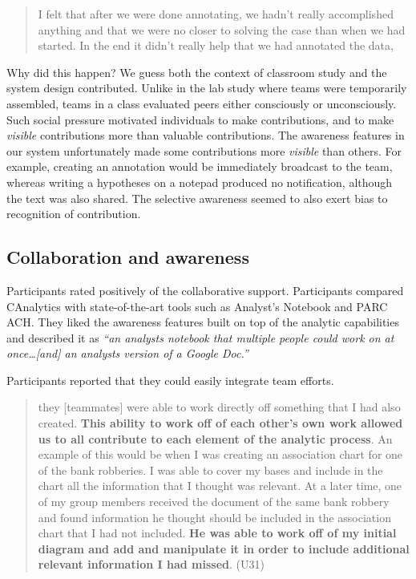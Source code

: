 \begin{quote}
I felt that after we were done annotating, we hadn't really accomplished
anything and that we were no closer to solving the case than when we had
started. In the end it didn't really help that we had annotated the
data,
\end{quote}

Why did this happen? We guess both the context of classroom study and
the system design contributed. Unlike in the lab study where teams were
temporarily assembled, teams in a class evaluated peers either
consciously or unconsciously. Such social pressure motivated individuals
to make contributions, and to make \emph{visible} contributions more
than valuable contributions. The awareness features in our system
unfortunately made some contributions more \emph{visible} than others.
For example, creating an annotation would be immediately broadcast to
the team, whereas writing a hypotheses on a notepad produced no
notification, although the text was also shared. The selective awareness
seemed to also exert bias to recognition of contribution.

\subsection{Collaboration and
awareness}\label{collaboration-and-awareness}

Participants rated positively of the collaborative support. Participants
compared CAnalytics with state-of-the-art tools such as Analyst's
Notebook and PARC ACH. They liked the awareness features built on top of
the analytic capabilities and described it as \emph{``an analysts
notebook that multiple people could work on at once\ldots{}{[}and{]} an
analysts version of a Google Doc.''}

Participants reported that they could easily integrate team efforts.

\begin{quote}
they {[}teammates{]} were able to work directly off something that I had
also created. \textbf{This ability to work off of each other's own work
allowed us to all contribute to each element of the analytic process}.
An example of this would be when I was creating an association chart for
one of the bank robberies. I was able to cover my bases and include in
the chart all the information that I thought was relevant. At a later
time, one of my group members received the document of the same bank
robbery and found information he thought should be included in the
association chart that I had not included. \textbf{He was able to work
off of my initial diagram and add and manipulate it in order to include
additional relevant information I had missed}. (U31)
\end{quote}


